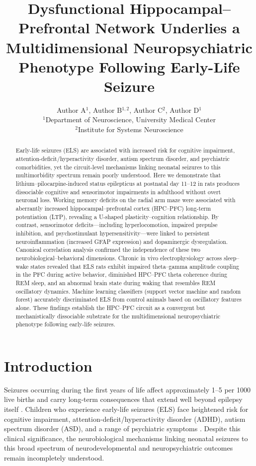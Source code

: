\documentclass[11pt]{article}
\title{Dysfunctional Hippocampal--Prefrontal Network Underlies a Multidimensional Neuropsychiatric Phenotype Following Early-Life Seizure}
\author{Author A$^{1}$, Author B$^{1,2}$, Author C$^{2}$, Author D$^{1}$\\[6pt]
$^{1}$Department of Neuroscience, University Medical Center\\
$^{2}$Institute for Systems Neuroscience}
\date{}
\begin{document}
\maketitle

\begin{abstract}
Early-life seizures (ELS) are associated with increased risk for cognitive impairment, attention-deficit/hyperactivity disorder, autism spectrum disorder, and psychiatric comorbidities, yet the circuit-level mechanisms linking neonatal seizures to this multimorbidity spectrum remain poorly understood. Here we demonstrate that lithium--pilocarpine-induced status epilepticus at postnatal day 11--12 in rats produces dissociable cognitive and sensorimotor impairments in adulthood without overt neuronal loss. Working memory deficits on the radial arm maze were associated with aberrantly increased hippocampal--prefrontal cortex (HPC--PFC) long-term potentiation (LTP), revealing a U-shaped plasticity--cognition relationship. By contrast, sensorimotor deficits---including hyperlocomotion, impaired prepulse inhibition, and psychostimulant hypersensitivity---were linked to persistent neuroinflammation (increased GFAP expression) and dopaminergic dysregulation. Canonical correlation analysis confirmed the independence of these two neurobiological--behavioral dimensions. Chronic in vivo electrophysiology across sleep--wake states revealed that ELS rats exhibit impaired theta--gamma amplitude coupling in the PFC during active behavior, diminished HPC--PFC theta coherence during REM sleep, and an abnormal brain state during waking that resembles REM oscillatory dynamics. Machine learning classifiers (support vector machine and random forest) accurately discriminated ELS from control animals based on oscillatory features alone. These findings establish the HPC--PFC circuit as a convergent but mechanistically dissociable substrate for the multidimensional neuropsychiatric phenotype following early-life seizures.
\end{abstract}

\section{Introduction}

Seizures occurring during the first years of life affect approximately 1--5 per 1000 live births and carry long-term consequences that extend well beyond epilepsy itself \citep{cornaggia2006relevance}. Children who experience early-life seizures (ELS) face heightened risk for cognitive impairment, attention-deficit/hyperactivity disorder (ADHD), autism spectrum disorder (ASD), and a range of psychiatric symptoms \citep{holmes2002seizures, ben-ari2008seizures}. Despite this clinical significance, the neurobiological mechanisms linking neonatal seizures to this broad spectrum of neurodevelopmental and neuropsychiatric outcomes remain incompletely understood.
\end{document}

